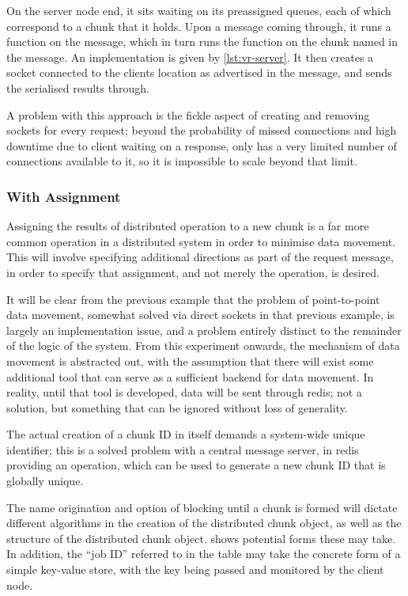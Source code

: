 On the server node end, it sits waiting on its preassigned queues, each of which correspond to a chunk that it holds.
Upon a message coming through, it runs a  function on the message, which in turn runs the function on the chunk named in the message.
An implementation is given by \cref{lst:vr-server}.
It then creates a socket connected to the clients location as advertised in the message, and sends the serialised results through.

A problem with this approach is the fickle aspect of creating and removing sockets for every request; beyond the probability of missed connections and high downtime due to client waiting on a response, \R{} only has a very limited number of connections available to it, so it is impossible to scale beyond that limit.

\subsubsection{With Assignment}

Assigning the results of distributed operation to a new chunk is a far more common operation in a distributed system in order to minimise data movement.
This will involve specifying additional directions as part of the request message, in order to specify that assignment, and not merely the operation, is desired.

It will be clear from the previous example that the problem of point-to-point data movement, somewhat solved via direct sockets in that previous example, is largely an implementation issue, and a problem entirely distinct to the remainder of the logic of the system.
From this experiment onwards, the mechanism of data movement is abstracted out, with the assumption that there will exist some additional tool that can serve as a sufficient backend for data movement.
In reality, until that tool is developed, data will be sent through redis; not a solution, but something that can be ignored without loss of generality.

The actual creation of a chunk ID in itself demands a system-wide unique identifier; this is a solved problem with a central message server, in redis providing an  operation, which can be used to generate a new chunk ID that is globally unique.

The name origination and option of blocking until a chunk is formed will dictate different algorithms in the creation of the distributed chunk object, as well as the structure of the distributed chunk object.
 shows potential forms these may take.
In addition, the ``job ID'' referred to in the table may take the concrete form of a simple key-value store, with the key being passed and monitored by the client node.

